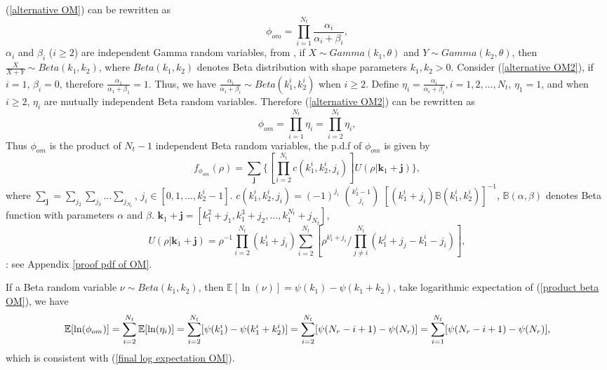 \documentclass[12pt, draftclsnofoot, onecolumn]{IEEEtran}
\begin{document}
(\ref{alternative OM}) can be rewritten as
\begin{equation}
\phi_{om}=\prod_{i=1}^{N_{t}}\frac{\alpha_{i}}{\alpha_{i}+\beta_{i}},
\label{alternative OM2}
\end{equation}
$\alpha_{i}$ and $\beta_{i}$ ($i\geq 2$) are independent Gamma random variables, from \cite{gupta2004handbook}, if $X\sim Gamma(k_{1},\theta)$ and $Y\sim Gamma(k_{2},\theta)$, then $\frac{X}{X+Y}\sim Beta(k_{1},k_{2})$, where $Beta(k_{1}, k_{2})$ denotes Beta distribution with shape parameters $k_{1}, k_{2}>0$. Consider (\ref{alternative OM2}), if $i=1$, $\beta_{i}=0$, therefore $\frac{\alpha_{1}}{\alpha_{1}+\beta_{1}}=1$. Thus, we have $\frac{\alpha_{i}}{\alpha_{i}+\beta_{i}}\sim Beta(k^{i}_{1}, k^{i}_{2})$ when $i\geq 2$. Define $\eta_{i}=\frac{\alpha_{i}}{\alpha_{i}+\beta_{i}}, i=1,2,\ldots, N_{t}$, $\eta_{1}=1$, and when $i\geq 2$, $\eta_{i}$ are mutually independent Beta random variables. Therefore (\ref{alternative OM2}) can be rewritten as 
  \begin{equation}
  \phi_{om}=\prod_{i=1}^{N_{t}}\eta_{i}=\prod_{i=2}^{N_{t}}\eta_{i},
  \label{product beta OM}
  \end{equation}
Thus $\phi_{om}$ is the product of $N_{t}-1$ independent Beta random variables, the p.d.f of $\phi_{om}$ is given by 
\begin{equation}
f_{\phi_{om}}(\rho)=\sum_{\mathbf{j}}\{[\prod_{i=2}^{N_{t}}c(k_{1}^{i},k_{2}^{i}, j_{i})]U(\rho|\mathbf{k}_{1}+\mathbf{j})\},
\label{pdf of OM}
\end{equation}
where $\sum_{\mathbf{j}}=\sum_{j_{2}}\sum_{j_{3}}\ldots\sum_{j_{N_{t}}}$, $j_{i}\in [0,1,\ldots, k_{2}^{i}-1]$. $c(k_{1}^{i}, k_{2}^{i}, j_{i})=(-1)^{j_{i}}$ $k_{2}^{i}-1\choose j_{i}$ $[(k_{1}^{i}+j_{i})\mathbb{B}(k_{1}^{i},k_{2}^{i})]^{-1}$, $\mathbb{B}(\alpha, \beta)$ denotes Beta function with parameters $\alpha$ and $\beta$. $\mathbf{k}_{1}+\mathbf{j}=[k_{1}^{2}+j_{1}, k_{1}^{3}+j_{2},\ldots, k_{1}^{N_{t}}+j_{N_{t}}]$, 
\begin{equation}
U(\rho|\mathbf{k}_{1}+\mathbf{j})=\rho^{-1}\prod_{i=2}^{N_{t}}(k_{1}^{i}+j_{i})\sum_{i=2}^{N_{t}}[\rho^{k_{1}^{i}+j_{i}}/\prod_{j\neq i}^{N_{t}}(k_{1}^{j}+j_{j}-k_{1}^{i}-j_{i})],
\label{auxiliary pdf of OM}
\end{equation}
\proof{}: see Appendix \ref{proof pdf of OM}. 

If a Beta random variable $\nu\sim Beta(k_{1}, k_{2})$, then $\mathbb{E}[\ln(\nu)]=\psi(k_{1})-\psi(k_{1}+k_{2})$\cite{papoulis2002probability}, take logarithmic expectation of (\ref{product beta OM}), we have 
\begin{equation}
\mathbb{E}[\ln(\phi_{om})]=\sum_{i=2}^{N_{t}}\mathbb{E}[\ln(\eta_{i})]=\sum_{i=2}^{N_{t}}[\psi(k^{i}_{1})-\psi(k^{i}_{1}+k^{i}_{2})]=\sum_{i=2}^{N_{t}}[\psi(N_{r}-i+1)-\psi(N_{r})]\\
=\sum_{i=1}^{N_{t}}[\psi(N_{r}-i+1)-\psi(N_{r})],
\label{final log expectation OM beta}
\end{equation}
which is consistent with (\ref{final log expectation OM}).
\end{document}
